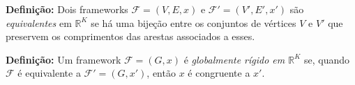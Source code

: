 \begin{center}
	\begin{minipage}{0.93 \linewidth}
		\textbf{Definição:} Dois frameworks $\mathcal{F} = (V,E,x)$ e $\mathcal{F'} = (V',E',x')$ são \textit{equivalentes} em $\mathbb{R}^K$ se há uma bijeção entre os conjuntos de vértices $V$ e $V'$ que preservem os comprimentos das arestas associados a esses.
	\end{minipage}
\end{center}

\begin{center}
	\begin{minipage}{0.93 \linewidth}
		\textbf{Definição:} Um framework $\mathcal{F} = (G,x)$ é \textit{globalmente rígido em $\mathbb{R}^K$} se, quando $\mathcal{F}$ é equivalente a $\mathcal{F}' = (G,x')$, então $x$ é congruente a $x'$.
	\end{minipage}
\end{center}


